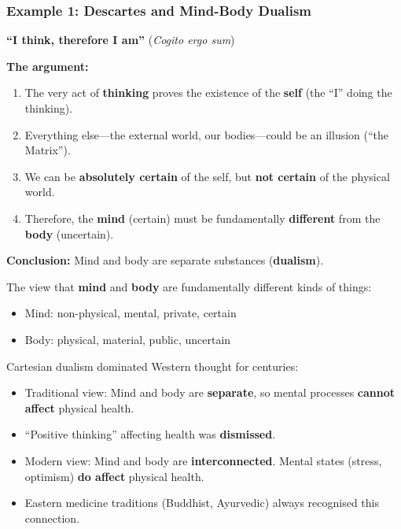 \bigseparator

\subsubsection{Example 1: Descartes and Mind-Body Dualism}

\begin{thmbox}
\textbf{``I think, therefore I am''} (\textit{Cogito ergo sum})

\textbf{The argument:}
\begin{enumerate}
  \item The very act of \textbf{thinking} proves the existence of the \textbf{self} (the ``I'' doing the thinking).
  \item Everything else---the external world, our bodies---could be an illusion (``the Matrix'').
  \item We can be \textbf{absolutely certain} of the self, but \textbf{not certain} of the physical world.
  \item Therefore, the \textbf{mind} (certain) must be fundamentally \textbf{different} from the \textbf{body} (uncertain).
\end{enumerate}

\textbf{Conclusion:} Mind and body are separate substances (\textbf{dualism}).
\end{thmbox}

\begin{defbox}
The view that \textbf{mind} and \textbf{body} are fundamentally different kinds of things:
\begin{itemize}
  \item Mind: non-physical, mental, private, certain
  \item Body: physical, material, public, uncertain
\end{itemize}
\end{defbox}

\begin{exbox}
Cartesian dualism dominated Western thought for centuries:
\begin{itemize}
  \item Traditional view: Mind and body are \textbf{separate}, so mental processes \textbf{cannot affect} physical health.
  \item ``Positive thinking'' affecting health was \textbf{dismissed}.
  \item Modern view: Mind and body are \textbf{interconnected}. Mental states (stress, optimism) \textbf{do affect} physical health.
  \item Eastern medicine traditions (Buddhist, Ayurvedic) always recognised this connection.
\end{itemize}
\end{exbox}

